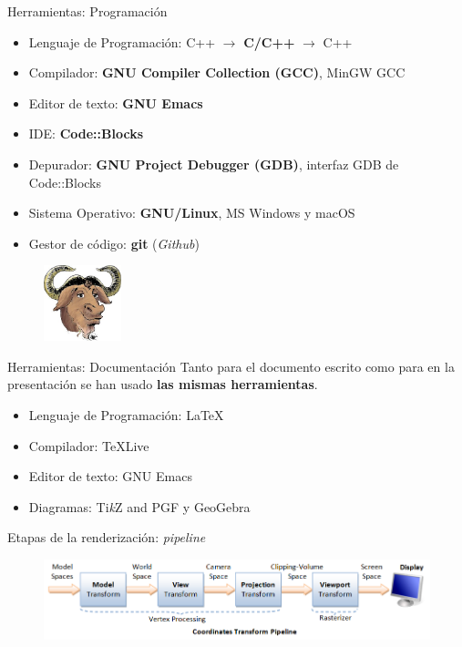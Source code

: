 \documentclass{beamer}
\begin{document}
\begin{frame}{Herramientas: Programación}
  \begin{itemize}
  \item{Lenguaje de Programación: C++ $\rightarrow$ \textbf{C/C++} $\rightarrow$ C++}
  \item{Compilador: \textbf{GNU Compiler Collection (GCC)}, MinGW GCC}
  \item{Editor de texto: \textbf{GNU Emacs}}
  \item{IDE: \textbf{Code::Blocks}}
  \item{Depurador: \textbf{GNU Project Debugger (GDB)}, interfaz GDB de Code::Blocks}
  \item{Sistema Operativo: \textbf{GNU/Linux}, MS Windows y macOS}
  \item{Gestor de código: \textbf{git} (\textit{Github})}
  \end{itemize}
  \begin{figure} [h]
    \centering
    \includegraphics[width=0.2\textwidth]{img/reiss-head}
  \end{figure}
\end{frame}

\begin{frame}{Herramientas: Documentación}
  Tanto para el documento escrito como para en la presentación se han usado \textbf{las mismas herramientas}.
  \begin{itemize}
  \item{Lenguaje de Programación: \textrm{\LaTeX}}
  \item{Compilador: \textrm{\TeX  Live}}
  \item{Editor de texto: GNU Emacs}
  \item{Diagramas: Ti\textit{k}Z and PGF y GeoGebra}
  \end{itemize}
\end{frame}


\begin{frame}{Etapas de la renderización: \textit{pipeline}}
  \begin{figure}
    \centering
    \includegraphics[width=\textwidth]{img/pipeline}
    \end{figure}
\end{frame}
\end{document}
